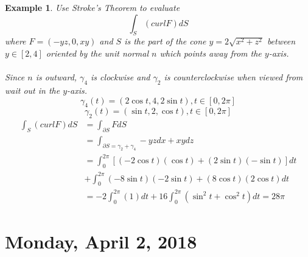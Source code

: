 \documentclass[12pt]{article}
\theoremstyle{plain}
\newtheorem{example}[theorem]{Example}
\theoremstyle{definition}
\begin{document}
\begin{example}
	Use Stroke's Theorem to evaluate
	$$\int_S (curl F) dS$$
	where $F = (-yz, 0, xy)$ and $S$ is the part of the cone $y=2\sqrt{x^2 + z^2}$ between $y\in[2,4]$ oriented by the unit normal $n$ which points away from the $y$-axis.\\
	\\
	Since $n$ is outward, $\gamma_4$ is clockwise and $\gamma_2$ is counterclockwise when viewed from wait out in the $y$-axis.
	$$\gamma_4 (t) = (2\cos t, 4, 2\sin t), t\in [0,2\pi]$$
	$$\gamma_2 (t) = (\sin t, 2, \cos t), t\in[0,2\pi]$$
	\begin{align*}
		\int_S (curl F)dS &= \int_{\partial S} F dS\\
		&= \int_{\partial S = \gamma_2 + \gamma_4} -yzdx+xydz\\
		&= \int^{2\pi}_0 [(-2\cos t)(\cos t) + (2\sin t) (-\sin t)]dt\\ &+ \int^{2\pi}_0 (-8\sin t)(-2\sin t)+ (8\cos t)(2\cos t)dt\\
		&= -2\int^{2\pi}_0 (1)dt + 16\int^{2\pi}_0 (\sin^2 t + \cos^2 t)dt = 28\pi
	\end{align*}
\end{example}

\newpage

\section{Monday, April 2, 2018}
\end{document}

